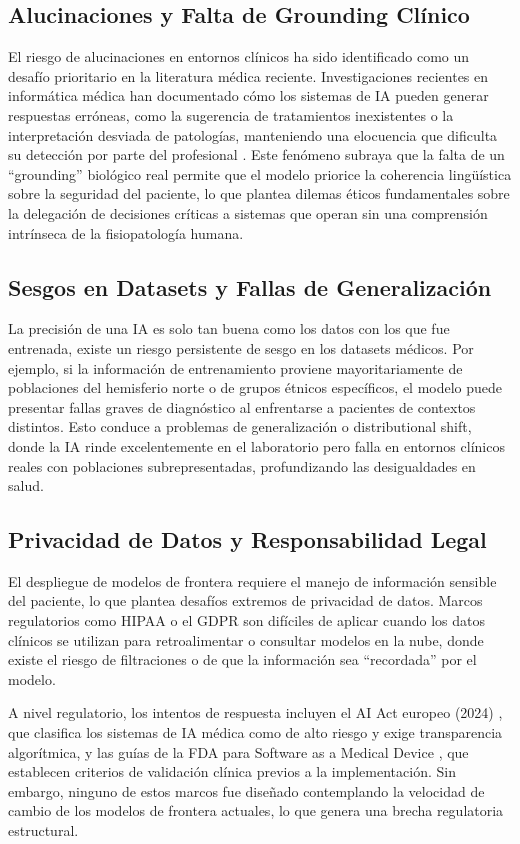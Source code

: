 \documentclass[10pt,a4paper]{article}
\begin{document}
\subsection{Alucinaciones y Falta de Grounding Clínico}
El riesgo de alucinaciones en entornos clínicos ha sido identificado como un desafío prioritario en la literatura médica reciente. Investigaciones recientes en informática médica han documentado cómo los sistemas de IA pueden generar respuestas erróneas, como la sugerencia de tratamientos inexistentes o la interpretación desviada de patologías, manteniendo una elocuencia que dificulta su detección por parte del profesional \cite{hallucinations}. Este fenómeno subraya que la falta de un ``grounding'' biológico real permite que el modelo priorice la coherencia lingüística sobre la seguridad del paciente, lo que plantea dilemas éticos fundamentales sobre la delegación de decisiones críticas a sistemas que operan sin una comprensión intrínseca de la fisiopatología humana.

\subsection{Sesgos en Datasets y Fallas de Generalización}
La precisión de una IA es solo tan buena como los datos con los que fue entrenada, existe un riesgo persistente de sesgo en los datasets médicos. Por ejemplo, si la información de entrenamiento proviene mayoritariamente de poblaciones del hemisferio norte o de grupos étnicos específicos, el modelo puede presentar fallas graves de diagnóstico al enfrentarse a pacientes de contextos distintos. Esto conduce a problemas de generalización o distributional shift, donde la IA rinde excelentemente en el laboratorio pero falla en entornos clínicos reales con poblaciones subrepresentadas, profundizando las desigualdades en salud.

\subsection{Privacidad de Datos y Responsabilidad Legal}
El despliegue de modelos de frontera requiere el manejo de información sensible del paciente, lo que plantea desafíos extremos de privacidad de datos. Marcos regulatorios como HIPAA o el GDPR son difíciles de aplicar cuando los datos clínicos se utilizan para retroalimentar o consultar modelos en la nube, donde existe el riesgo de filtraciones o de que la información sea ``recordada'' por el modelo.

A nivel regulatorio, los intentos de respuesta incluyen el AI Act europeo (2024) \cite{ai-act}, que clasifica los sistemas de IA médica como de alto riesgo y exige transparencia algorítmica, y las guías de la FDA para Software as a Medical Device \cite{samd}, que establecen criterios de validación clínica previos a la implementación. Sin embargo, ninguno de estos marcos fue diseñado contemplando la velocidad de cambio de los modelos de frontera actuales, lo que genera una brecha regulatoria estructural.
\end{document}
